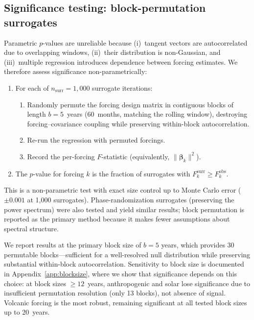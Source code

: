 \documentclass[preprint,12pt]{elsarticle}
\begin{document}
\subsection{Significance testing: block-permutation surrogates}\label{sec:surrogates}

Parametric $p$-values are unreliable because (i)~tangent vectors are autocorrelated due to overlapping windows, (ii)~their distribution is non-Gaussian, and (iii)~multiple regression introduces dependence between forcing estimates.
We therefore assess significance non-parametrically:

\begin{enumerate}
\item For each of $n_\mathrm{surr} = 1{,}000$ surrogate iterations:
  \begin{enumerate}
  \item Randomly permute the forcing design matrix in contiguous blocks of length $b = 5$~years (60~months, matching the rolling window), destroying forcing--covariance coupling while preserving within-block autocorrelation.
  \item Re-run the regression with permuted forcings.
  \item Record the per-forcing $F$-statistic (equivalently, $\|\bm{\beta}_k\|^2$).
  \end{enumerate}
\item The $p$-value for forcing $k$ is the fraction of surrogates with $F_k^\mathrm{surr} \geq F_k^\mathrm{obs}$.
\end{enumerate}

This is a non-parametric test with exact size control up to Monte Carlo error ($\pm 0.001$ at 1{,}000 surrogates).
Phase-randomization surrogates (preserving the power spectrum) were also tested and yield similar results; block permutation is reported as the primary method because it makes fewer assumptions about spectral structure.

We report results at the primary block size of $b = 5$ years, which provides 30 permutable blocks---sufficient for a well-resolved null distribution while preserving substantial within-block autocorrelation.
Sensitivity to block size is documented in Appendix~\ref{app:blocksize}, where we show that significance depends on this choice: at block sizes $\geq 12$~years, anthropogenic and solar lose significance due to insufficient permutation resolution (only 13 blocks), not absence of signal.
Volcanic forcing is the most robust, remaining significant at all tested block sizes up to 20~years.
\end{document}
